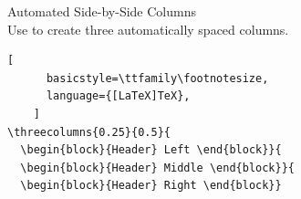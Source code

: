 \documentclass[aspectratio=169,12pt]{beamer}
\begin{document}
\begin{frame}[fragile]{Automated Side-by-Side Columns }
  \\
  Use  to create three automatically spaced columns.

  \smallskip
  \smallskip

  \medskip
  \begin{lstlisting}[
      basicstyle=\ttfamily\footnotesize,
      language={[LaTeX]TeX},
    ]
\threecolumns{0.25}{0.5}{
  \begin{block}{Header} Left \end{block}}{
  \begin{block}{Header} Middle \end{block}}{
  \begin{block}{Header} Right \end{block}}
  \end{lstlisting}
\end{frame}
\end{document}
